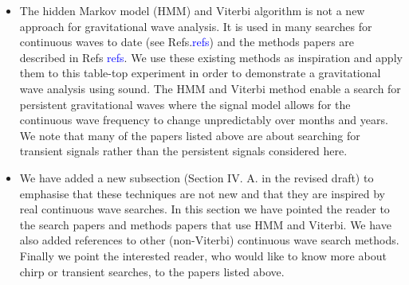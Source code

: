 \documentclass{article}
\newcommand{\todo}{\textcolor{blue}}
\newcommand{\han}{\textcolor{orange}}
\begin{document}
\begin{itemize}
\item The hidden Markov model (HMM) and Viterbi algorithm is not a new approach for gravitational wave analysis. It is used in many searches for continuous waves to date (see Refs.\todo{refs}) and the methods papers are described in Refs \todo{refs}. We use these existing methods as inspiration and apply them to this table-top experiment in order to demonstrate a gravitational wave analysis using sound. The HMM and Viterbi method enable a search for persistent gravitational waves where the signal model allows for the continuous wave frequency to change unpredictably over months and years. We note that many of the papers listed above are about searching for transient signals rather than the persistent signals considered here. 
\item We have added a new subsection (Section IV. A. in the revised draft) to emphasise that these techniques are not new and that they are inspired by real continuous wave searches. In this section we have pointed the reader to the search papers and methods papers that use HMM and Viterbi. We have also added references to other (non-Viterbi) continuous wave search methods. Finally we point the interested reader, who would like to know more about chirp or transient searches, to the papers listed above. 
\end{itemize}
\end{document}
